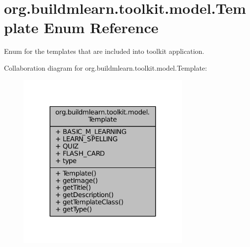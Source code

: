 \hypertarget{enumorg_1_1buildmlearn_1_1toolkit_1_1model_1_1Template}{\section{org.\-buildmlearn.\-toolkit.\-model.\-Template Enum Reference}
\label{enumorg_1_1buildmlearn_1_1toolkit_1_1model_1_1Template}
}


Enum for the templates that are included into toolkit application.  




Collaboration diagram for org.\-buildmlearn.\-toolkit.\-model.\-Template\-:
\nopagebreak
\begin{figure}[H]
\begin{center}
\leavevmode
\includegraphics[width=240pt]{d2/dab/enumorg_1_1buildmlearn_1_1toolkit_1_1model_1_1Template__coll__graph}
\end{center}
\end{figure}

